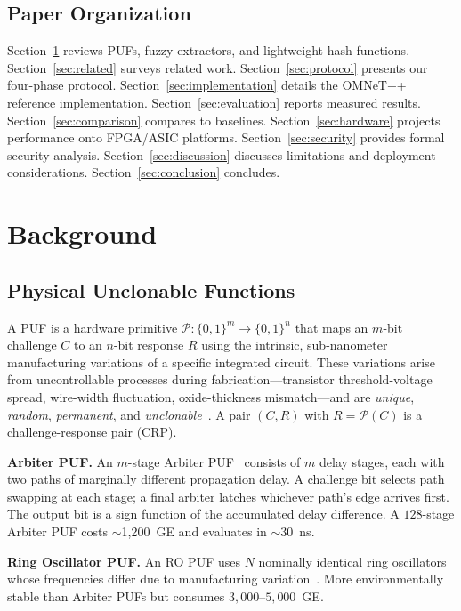 \documentclass[journal,a4paper,10pt]{IEEEtran}
\begin{document}
\subsection*{Paper Organization}
Section~\ref{sec:background} reviews PUFs, fuzzy extractors, and
lightweight hash functions. Section~\ref{sec:related} surveys related
work. Section~\ref{sec:protocol} presents our four-phase protocol.
Section~\ref{sec:implementation} details the OMNeT++ reference
implementation. Section~\ref{sec:evaluation} reports measured results.
Section~\ref{sec:comparison} compares to baselines.
Section~\ref{sec:hardware} projects performance onto FPGA/ASIC
platforms. Section~\ref{sec:security} provides formal security
analysis. Section~\ref{sec:discussion} discusses limitations and
deployment considerations. Section~\ref{sec:conclusion} concludes.


\section{Background}
\label{sec:background}

\subsection{Physical Unclonable Functions}
A PUF is a hardware primitive $\mathcal{P}:\{0,1\}^m \to \{0,1\}^n$
that maps an $m$-bit challenge $C$ to an $n$-bit response $R$ using
the intrinsic, sub-nanometer manufacturing variations of a specific
integrated circuit. These variations arise from uncontrollable
processes during fabrication---transistor threshold-voltage spread,
wire-width fluctuation, oxide-thickness mismatch---and are
\emph{unique}, \emph{random}, \emph{permanent}, and
\emph{unclonable}~\cite{puf_overview}. A pair $(C,R)$ with
$R=\mathcal{P}(C)$ is a challenge-response pair (CRP).

\textbf{Arbiter PUF.} An $m$-stage Arbiter PUF~\cite{arbiter_puf_iot}
consists of $m$ delay stages, each with two paths of marginally
different propagation delay. A challenge bit selects path swapping at
each stage; a final arbiter latches whichever path's edge arrives
first. The output bit is a sign function of the accumulated delay
difference. A $128$-stage Arbiter PUF costs $\sim$1{,}200~GE and
evaluates in $\sim$30~ns.

\textbf{Ring Oscillator PUF.} An RO PUF uses $N$ nominally identical
ring oscillators whose frequencies differ due to manufacturing
variation~\cite{ro_puf_dependable, ro_puf_design}. More
environmentally stable than Arbiter PUFs but consumes
$3{,}000$--$5{,}000$~GE.
\end{document}
